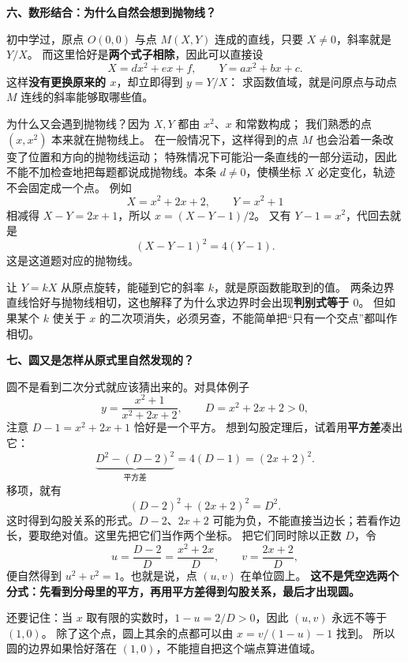 \begin{explanationbox}
  \bigskip
  \textbf{\textcolor{CExplanation}{六、数形结合：为什么自然会想到抛物线？}}

  \medskip
  初中学过，原点 $O(0,0)$ 与点 $M(X,Y)$ 连成的直线，只要 $X\ne0$，斜率就是 $Y/X$。
  而这里恰好是\textbf{两个式子相除}，因此可以直接设
  \[
    X=dx^2+ex+f,\qquad Y=ax^2+bx+c.
  \]
  这样\textbf{没有更换原来的 $x$}，却立即得到 $y=Y/X$：
  求函数值域，就是问原点与动点 $M$ 连线的斜率能够取哪些值。

  \medskip
  为什么又会遇到抛物线？因为 $X,Y$ 都由 $x^2$、$x$ 和常数构成；
  我们熟悉的点 $(x,x^2)$ 本来就在抛物线上。
  在一般情况下，这样得到的点 $M$ 也会沿着一条改变了位置和方向的抛物线运动；
  特殊情况下可能沿一条直线的一部分运动，因此不能不加检查地把每题都说成抛物线。本条 $d\ne0$，使横坐标 $X$ 必定变化，轨迹不会固定成一个点。
  例如
  \[
    X=x^2+2x+2,\qquad Y=x^2+1
  \]
  相减得 $X-Y=2x+1$，所以 $x=(X-Y-1)/2$。
  又有 $Y-1=x^2$，代回去就是
  \[
    \boxed{(X-Y-1)^2=4(Y-1).}
  \]
  这是这道题对应的抛物线。
\begin{center}\end{center}
让 $Y=kX$ 从原点旋转，能碰到它的斜率 $k$，就是原函数能取到的值。
  两条边界直线恰好与抛物线相切，这也解释了为什么求边界时会出现\textbf{判别式等于 $0$}。
  但如果某个 $k$ 使关于 $x$ 的二次项消失，必须另查，不能简单把“只有一个交点”都叫作相切。

  \bigskip
  \textbf{\textcolor{CExplanation}{七、圆又是怎样从原式里自然发现的？}}

  \medskip
  圆不是看到二次分式就应该猜出来的。对具体例子
  \[
    y=\frac{x^2+1}{x^2+2x+2},\qquad D=x^2+2x+2>0,
  \]
  注意 $D-1=x^2+2x+1$ 恰好是一个平方。
  想到勾股定理后，试着用\textbf{平方差}凑出它：
  \[
    \underbrace{D^2-(D-2)^2}_{\text{平方差}}=4(D-1)=(2x+2)^2.
  \]
  移项，就有
  \[
    \boxed{(D-2)^2+(2x+2)^2=D^2.}
  \]
  这时得到勾股关系的形式。$D-2$、$2x+2$ 可能为负，不能直接当边长；若看作边长，要取绝对值。这里先把它们当作两个坐标。
  把它们同时除以正数 $D$，令
  \[
    u=\frac{D-2}{D}=\frac{x^2+2x}{D},\qquad
    v=\frac{2x+2}{D},
  \]
  便自然得到 $u^2+v^2=1$。也就是说，点 $(u,v)$ 在单位圆上。
  \textbf{这不是凭空选两个分式：先看到分母里的平方，再用平方差得到勾股关系，最后才出现圆。}
\begin{center}\end{center}


  \medskip
  还要记住：当 $x$ 取有限的实数时，$1-u=2/D>0$，因此 $(u,v)$ 永远不等于 $(1,0)$。
  除了这个点，圆上其余的点都可以由 $x=v/(1-u)-1$ 找到。
  所以圆的边界如果恰好落在 $(1,0)$，不能擅自把这个端点算进值域。
\end{explanationbox}

